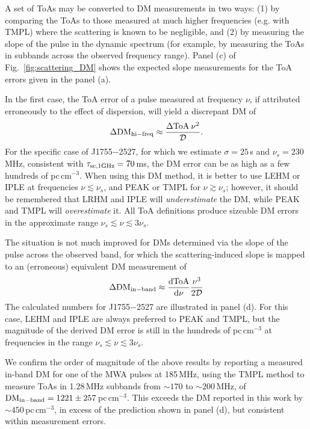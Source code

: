 \documentclass[fleqn,usenatbib]{mnras}
\newcommand{\src}{J1755$-$2527}
\newcommand{\deriv}[2]{\frac{{\rm d}{#1}}{{\rm d}{#2}}}
\newcommand{\ToA}[1]{{\rm ToA}_{\rm {#1}}}
\newcommand{\Fig}{Fig.}
\begin{document}
A set of ToAs may be converted to DM measurements in two ways: (1) by comparing the ToAs to those measured at much higher frequencies (e.g. with TMPL) where the scattering is known to be negligible, and (2) by measuring the slope of the pulse in the dynamic spectrum (for example, by measuring the ToAs in subbands across the observed frequency range).
Panel (c) of \Fig~\ref{fig:scattering_DM} shows the expected slope measurements for the ToA errors given in the panel (a).

In the first case, the ToA error of a pulse measured at frequency $\nu$, if attributed erroneously to the effect of dispersion, will yield a discrepant DM of
\begin{equation}
    \Delta{\rm DM}_{\rm hi-freq} \approx \frac{\Delta\ToA{}\,\nu^2}{\mathcal{D}}.
\end{equation}
For the specific case of \src{}, for which we estimate $\sigma = 25\,$s and $\nu_s = 230\,$MHz, consistent with $\tau_{\rm sc,1 GHz} = 70\,$ms, the DM error can be as high as a few hundreds of pc\,cm$^{-3}$.
When using this DM method, it is better to use LEHM or IPLE at frequencies $\nu \lesssim \nu_s$, and PEAK or TMPL for $\nu \gtrsim \nu_s$; however, it should be remembered that LRHM and IPLE will \emph{underestimate} the DM, while PEAK and TMPL will \emph{overestimate} it.
All ToA definitions produce sizeable DM errors in the approximate range $\nu_s \lesssim \nu \lesssim 3\nu_s$.

The situation is not much improved for DMs determined via the slope of the pulse across the observed band, for which the scattering-induced slope is mapped to an (erroneous) equivalent DM measurement of
\begin{equation}
    \Delta{\rm DM}_{\rm in-band} \approx \deriv{{\rm ToA}}{\nu} \frac{\nu^3}{2\mathcal{D}}
\end{equation}
The calculated numbers for \src{} are illustrated in panel (d).
For this case, LEHM and IPLE are always preferred to PEAK and TMPL, but the magnitude of the derived DM error is still in the hundreds of pc\,cm$^{-3}$ at frequencies in the range $\nu_s \lesssim \nu \lesssim 3\nu_s$.

We confirm the order of magnitude of the above results by reporting a measured in-band DM for one of the MWA pulses at 185\,MHz, using the TMPL method to measure ToAs in 1.28\,MHz subbands from ${\sim}170$ to ${\sim}200\,$MHz, of ${\rm DM}_{\rm in-band} = 1221\pm257\,$pc\,cm$^{-3}$.
This exceeds the DM reported in this work by ${\sim}450\,$pc\,cm$^{-3}$, in excess of the prediction shown in panel (d), but consistent within measurement errors.


\bsp	%
\label{lastpage}
\end{document}
